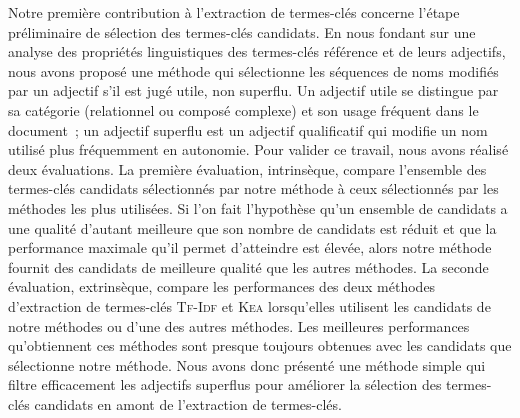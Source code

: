   Notre première contribution à l'extraction de termes-clés concerne l'étape
  préliminaire de sélection des termes-clés candidats. En nous fondant sur une
  analyse des propriétés linguistiques des termes-clés référence et de leurs
  adjectifs, nous avons proposé une méthode qui sélectionne les séquences de
  noms modifiés par un adjectif s'il est jugé utile, non superflu. Un adjectif
  utile se distingue par sa catégorie (relationnel ou composé complexe) et son
  usage fréquent dans le document~; un adjectif superflu est un adjectif
  qualificatif qui modifie un nom utilisé plus fréquemment en autonomie. Pour
  valider ce travail, nous avons réalisé deux évaluations. La première
  évaluation, intrinsèque, compare l'ensemble des termes-clés candidats
  sélectionnés par notre méthode à ceux sélectionnés par les méthodes les plus
  utilisées. Si l'on fait l'hypothèse qu'un ensemble de candidats a une qualité
  d'autant meilleure que son nombre de candidats est réduit et que la
  performance maximale qu'il permet d'atteindre est élevée, alors notre méthode
  fournit des candidats de meilleure qualité que les autres méthodes. La seconde
  évaluation, extrinsèque, compare les performances des deux méthodes
  d'extraction de termes-clés \textsc{Tf-Idf} et \textsc{Kea} lorsqu'elles
  utilisent les candidats de notre méthodes ou d'une des autres méthodes. Les
  meilleures performances qu'obtiennent ces méthodes sont presque toujours
  obtenues avec les candidats que sélectionne notre méthode. Nous avons donc
  présenté une méthode simple qui filtre efficacement les adjectifs superflus
  pour améliorer la sélection des termes-clés candidats en amont de l'extraction
  de termes-clés.

